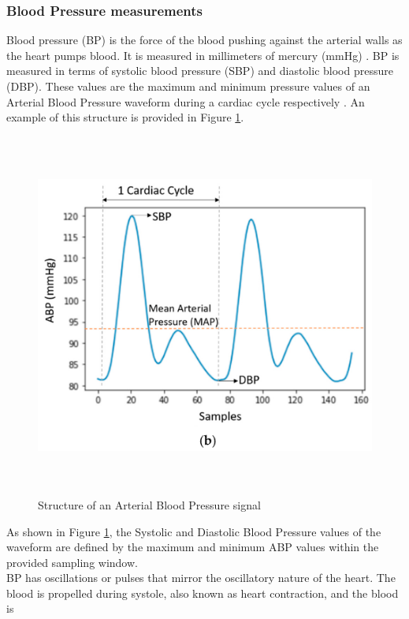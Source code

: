 \subsubsection{Blood Pressure measurements} 
Blood pressure (BP) is the force of the blood pushing against the 
arterial walls as the heart pumps blood. It is measured in millimeters of 
mercury (mmHg) \cite{Simjanoska20182}. BP  is  measured  in  terms  of  
systolic  blood  pressure  (SBP)  and  diastolic  blood  pressure  
(DBP). These values are the maximum and minimum pressure values of an 
Arterial Blood Pressure waveform during a cardiac cycle 
respectively \cite{Simjanoska20181} \cite{Pradenas2020}. An example of this structure is provided in Figure \ref{abp}.
\begin{figure}[H]
   \centering
   \includegraphics[width=12cm,height=12cm,keepaspectratio]{Background/abp.png}
   \caption{Structure of an Arterial Blood Pressure signal \cite{Athaya2021}}
   \label{abp}
\end{figure}\noindent As shown in Figure \ref{abp}, the Systolic and Diastolic Blood Pressure 
values of the waveform are defined by the maximum and minimum ABP values within the provided 
sampling window. \\ \newline \noindent BP  has 
oscillations or pulses that mirror the oscillatory nature of the heart. The blood is 
propelled during systole, also known as heart contraction, and the blood is  
